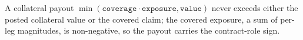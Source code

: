 \begin{theorem}\label{thm:credit-bound}
        \leanok
        A collateral payout $\min(\mathtt{coverage}\cdot\mathtt{exposure},
        \mathtt{value})$ never exceeds either the posted collateral value or the
        covered claim; the covered exposure, a sum of per-leg magnitudes, is
        non-negative, so the payout carries the contract-role sign.
\end{theorem}


